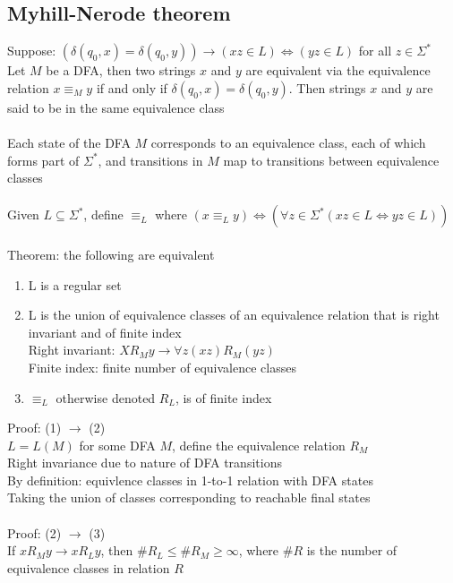 \documentclass{article}
\newcommand*{\<}{\langle}
\renewcommand*{\>}{\rangle}
\begin{document}
		\subsection{Myhill-Nerode theorem}
			Suppose: $(\delta(q_0, x) = \delta(q_0, y)) \to (xz \in L) \iff (yz \in L)$ for all $z \in \Sigma^*$ \\
			Let $M$ be a DFA, then two strings $x$ and $y$ are equivalent via the equivalence relation $x \equiv_M y$ if and only if $\delta(q_0, x) = \delta(q_0, y)$. Then strings $x$ and $y$ are said to be in the same equivalence class \\
			\\
			Each state of the DFA $M$ corresponds to an equivalence class, each of which forms part of $\Sigma^*$, and transitions in $M$ map to transitions between equivalence classes \\
			\\
			Given $L \subseteq \Sigma^*$, define $\equiv_L$ where $(x \equiv_L y) \iff (\forall z \in \Sigma^*(xz \in L \iff yz \in L))$ \\
			\\
			Theorem: the following are equivalent
			\begin{enumerate}[(1)]
				\item L is a regular set
				\item L is the union of equivalence classes of an equivalence relation that is right invariant and of finite index \\
				Right invariant: $XR_My \to \forall z (xz)R_M(yz)$ \\
				Finite index: finite number of equivalence classes
				\item $\equiv_L$ otherwise denoted $R_L$, is of finite index
				\end{enumerate}
			Proof: (1) $\to$ (2) \\
			$L = L(M)$ for some DFA $M$, define the equivalence relation $R_M$ \\
			Right invariance due to nature of DFA transitions \\
			By definition: equivlence classes in 1-to-1 relation with DFA states \\
			Taking the union of classes corresponding to reachable final states \\
			\\
			Proof: (2) $\to$ (3) \\
			If $xR_My \to xR_Ly$, then $\#R_L \leq \#R_M \geq \infty$, where $\#R$ is the number of equivalence classes in relation $R$ \\
\end{document}
